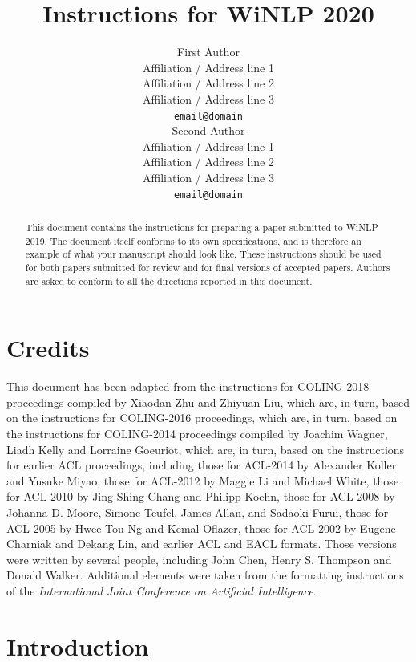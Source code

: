 \documentclass[11pt]{article}
\title{Instructions for WiNLP 2020}
\author{First Author \\
  Affiliation / Address line 1 \\
  Affiliation / Address line 2 \\
  Affiliation / Address line 3 \\
  {\tt email@domain} \\\And
  Second Author \\
  Affiliation / Address line 1 \\
  Affiliation / Address line 2 \\
  Affiliation / Address line 3 \\
  {\tt email@domain} \\}
\date{}
\begin{document}
\maketitle
\begin{abstract}
  This document contains the instructions for preparing a paper submitted
  to WiNLP 2019. The document itself
  conforms to its own specifications, and is therefore an example of
  what your manuscript should look like. These instructions should be
  used for both papers submitted for review and for final versions of
  accepted papers. Authors are asked to conform to all the directions
  reported in this document.
\end{abstract}

\section{Credits}

This document has been adapted from the instructions for  
COLING-2018 proceedings compiled by Xiaodan Zhu and Zhiyuan Liu, which are, in turn, based on the instructions for COLING-2016 proceedings,
which are, in turn, based on
the instructions for
COLING-2014 proceedings compiled by Joachim Wagner, Liadh Kelly
and Lorraine Goeuriot,
which are, in turn, based on the instructions for earlier ACL proceedings,
including 
those for ACL-2014 by Alexander Koller and Yusuke Miyao,
those for ACL-2012 by Maggie Li and Michael
White, those for ACL-2010 by Jing-Shing Chang and Philipp Koehn,
those for ACL-2008 by Johanna D. Moore, Simone Teufel, James Allan,
and Sadaoki Furui, those for ACL-2005 by Hwee Tou Ng and Kemal
Oflazer, those for ACL-2002 by Eugene Charniak and Dekang Lin, and
earlier ACL and EACL formats. Those versions were written by several
people, including John Chen, Henry S. Thompson and Donald
Walker. Additional elements were taken from the formatting
instructions of the {\em International Joint Conference on Artificial
  Intelligence}.

\section{Introduction}
\label{intro}
\end{document}
